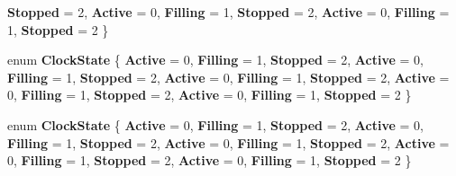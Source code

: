 \begin{DoxyCompactItemize}
\newline
{\bfseries Stopped} = 2, 
{\bfseries Active} = 0, 
{\bfseries Filling} = 1, 
{\bfseries Stopped} = 2, 
\newline
{\bfseries Active} = 0, 
{\bfseries Filling} = 1, 
{\bfseries Stopped} = 2
 \}
\item 
\mbox{\label{namespace_windows_1_1_u_i_1_1_xaml_1_1_media_1_1_animation_a33c8977536bd838bb2633f3476a7bd0a}} 
enum {\bfseries Clock\+State} \{ \newline
{\bfseries Active} = 0, 
{\bfseries Filling} = 1, 
{\bfseries Stopped} = 2, 
{\bfseries Active} = 0, 
\newline
{\bfseries Filling} = 1, 
{\bfseries Stopped} = 2, 
{\bfseries Active} = 0, 
{\bfseries Filling} = 1, 
\newline
{\bfseries Stopped} = 2, 
{\bfseries Active} = 0, 
{\bfseries Filling} = 1, 
{\bfseries Stopped} = 2, 
\newline
{\bfseries Active} = 0, 
{\bfseries Filling} = 1, 
{\bfseries Stopped} = 2
 \}
\item 
\mbox{\label{namespace_windows_1_1_u_i_1_1_xaml_1_1_media_1_1_animation_a33c8977536bd838bb2633f3476a7bd0a}} 
enum {\bfseries Clock\+State} \{ \newline
{\bfseries Active} = 0, 
{\bfseries Filling} = 1, 
{\bfseries Stopped} = 2, 
{\bfseries Active} = 0, 
\newline
{\bfseries Filling} = 1, 
{\bfseries Stopped} = 2, 
{\bfseries Active} = 0, 
{\bfseries Filling} = 1, 
\newline
{\bfseries Stopped} = 2, 
{\bfseries Active} = 0, 
{\bfseries Filling} = 1, 
{\bfseries Stopped} = 2, 
\newline
{\bfseries Active} = 0, 
{\bfseries Filling} = 1, 
{\bfseries Stopped} = 2
 \}
\end{DoxyCompactItemize}
